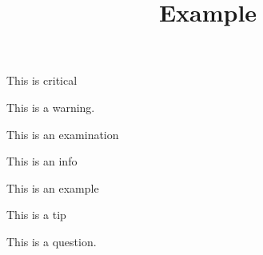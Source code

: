 \documentclass{liyua}
\title{Example}
\begin{document}
\maketitle
\tableofcontents
\begin{critical}
	This is critical
\end{critical}
\begin{warning}
	This is a warning.
\end{warning}
\begin{examination}
	This is an examination
\end{examination}
\begin{info}
	This is an info
\end{info}
\begin{example}
	This is an example
\end{example}
\begin{tip}
	This is a tip
\end{tip}
\begin{question}
	This is a question.
\end{question}
\lipsum[1-10]
\end{document}
